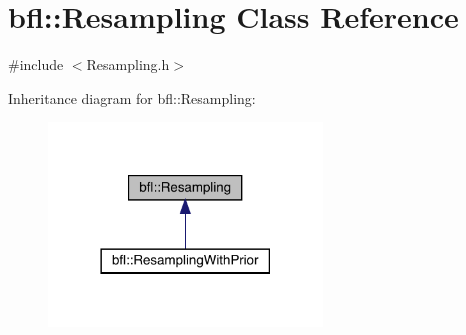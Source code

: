 \hypertarget{classbfl_1_1Resampling}{}\section{bfl\+:\+:Resampling Class Reference}
\label{classbfl_1_1Resampling}


{\ttfamily \#include $<$Resampling.\+h$>$}



Inheritance diagram for bfl\+:\+:Resampling\+:
\nopagebreak
\begin{figure}[H]
\begin{center}
\leavevmode
\includegraphics[width=206pt]{classbfl_1_1Resampling__inherit__graph}
\end{center}
\end{figure}
